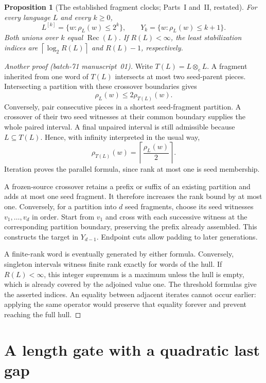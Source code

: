 \documentclass[11pt,letterpaper]{article}
\newtheorem{proposition}[theorem]{Proposition}
\theoremstyle{definition}
\theoremstyle{remark}
\newcommand{\rec}{\operatorname{Rec}}
\newcommand{\cut}{\otimes_{\mathrm c}}
\newcommand{\gen}[2]{#1^{[#2]}}
\newcommand{\rank}{\rho}
\newcommand{\clog}[1]{\left\lceil\log_2 #1\right\rceil}
\begin{document}
\begin{proposition}[The established fragment clocks; Parts~I and~II, restated]\label{ccc:qr:prop:clocks}
For every language $L$ and every $k\ge0$,
\[
\gen Lk=\{w:\rank_L(w)\le2^k\},
\qquad
Y_k=\{w:\rank_L(w)\le k+1\}.
\]
Both unions over $k$ equal $\rec(L)$. If $R(L)<\infty$, the least
stabilization indices are $\clog{R(L)}$ and $R(L)-1$, respectively.
\end{proposition}
\begin{proof}[Another proof (batch-71 manuscript~01)]
Write $T(L)=L\cut L$. A fragment inherited from one word of $T(L)$ intersects
at most two seed-parent pieces. Intersecting a partition with these crossover
boundaries gives
\[
\rank_L(w)\le2\rank_{T(L)}(w).
\]
Conversely, pair consecutive pieces in a shortest seed-fragment partition. A
crossover of their two seed witnesses at their common boundary supplies the
whole paired interval. A final unpaired interval is still admissible because
$L\subseteq T(L)$. Hence, with infinity interpreted in the usual way,
\[
\rank_{T(L)}(w)=\left\lceil\frac{\rank_L(w)}2\right\rceil.
\]
Iteration proves the parallel formula, since rank at most one is seed
membership.

A frozen-source crossover retains a prefix or suffix of an existing partition
and adds at most one seed fragment. It therefore increases the rank bound by
at most one. Conversely, for a partition into $d$ seed fragments, choose its
seed witnesses $v_1,\ldots,v_d$ in order. Start from $v_1$ and cross with each
successive witness at the corresponding partition boundary, preserving the
prefix already assembled. This constructs the target in $Y_{d-1}$. Endpoint
cuts allow padding to later generations.

A finite-rank word is eventually generated by either formula. Conversely,
singleton intervals witness finite rank exactly for words of the hull. If
$R(L)<\infty$, this integer supremum is a maximum unless the hull is empty,
which is already covered by the adjoined value one. The threshold formulas
give the asserted indices. An equality between adjacent iterates cannot occur
earlier: applying the same operator would preserve that equality forever and
prevent reaching the full hull.
\end{proof}

\section{A length gate with a quadratic last gap}\label{ccc:qr:sec:gate}
\end{document}
